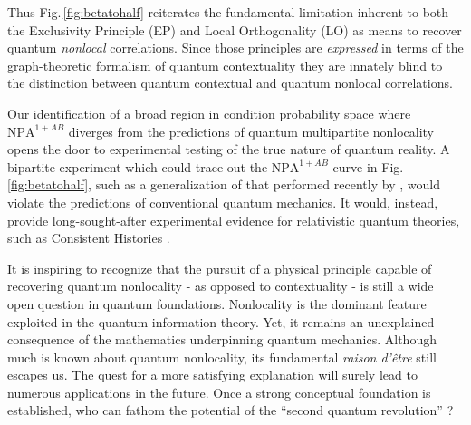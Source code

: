 \documentclass[
  12pt          %
  ,letterpaper  %
  ,center       %
  ,noupper      %
  ,english,fleqn]{uconnthesis}
\newcommand{\fig}[1]{Fig.\,\ref{#1}}
\begin{document}

Thus \fig{fig:betatohalf} reiterates the fundamental limitation inherent to both the Exclusivity Principle (EP) \cite{EPOriginal,EPSpecker,EPExampleGraphs,EPYan,EP2013,EPTwoCities,EPTsirelson} and Local Orthogonality (LO) \cite{LONatureComm,FritzCombinatorialLong,LONewShort,LOHardy,LOExploring} as means to recover quantum \emph{nonlocal} correlations. Since those principles are {\em expressed} in terms of the graph-theoretic formalism of quantum contextuality they are innately blind to the distinction between quantum contextual and quantum nonlocal correlations. 

Our identification of a broad region in condition probability space where $\mbox{NPA}^{1+AB}$ diverges from the predictions of quantum multipartite nonlocality opens the door to experimental testing of the true nature of quantum reality. A bipartite experiment which could trace out the $\mbox{NPA}^{1+AB}$ curve in \fig{fig:betatohalf}, such as a generalization of that performed recently by \citet{WolfeQBExperimental}, would violate the predictions of conventional quantum mechanics. It would, instead, provide long-sought-after experimental evidence for relativistic quantum theories, such as Consistent Histories \cite{ConsistentHistoriesContextuality}.



It is inspiring to recognize that the pursuit of a physical principle capable of recovering quantum nonlocality - as opposed to contextuality - is still a wide open question in quantum foundations. Nonlocality is the dominant feature exploited in the quantum information theory. Yet, it remains an unexplained consequence of the mathematics underpinning quantum mechanics. Although much is known about quantum nonlocality, its fundamental \textit{raison d'être} still escapes us. The quest for a more satisfying explanation will surely lead to numerous applications in the future. Once a strong conceptual foundation is established, who can fathom the potential of the ``second quantum revolution'' \cite{bell2004speakable,QuantumRevArXiv}?
\end{document}
